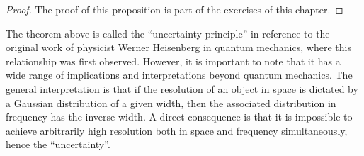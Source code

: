 \begin{proof}
	The proof of this proposition is part of the exercises of this chapter.
\end{proof}
The theorem above is called the ``uncertainty principle'' in reference to the original
work of physicist Werner Heisenberg in quantum mechanics, where this relationship was
first observed. However, it is important to note that it has a wide range of implications
and interpretations beyond quantum mechanics. The general interpretation is that if the
resolution of an object in space is dictated by a Gaussian distribution of a given width,
then the associated distribution in frequency has the inverse width. A direct consequence
is that it is impossible to achieve arbitrarily high resolution both in space and
frequency simultaneously, hence the ``uncertainty''.
